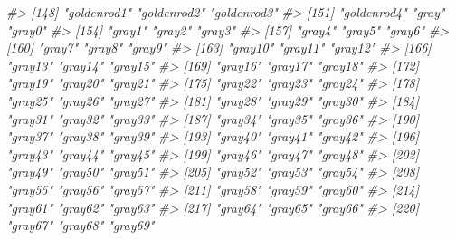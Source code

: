 \documentclass[
]{book}
\newenvironment{Shaded}{\begin{snugshade}}{\end{snugshade}}
\newcommand{\CommentTok}[1]{\textcolor[rgb]{0.56,0.35,0.01}{\textit{#1}}}
\begin{document}
\begin{Shaded}
\begin{Highlighting}[]
\CommentTok{\#\textgreater{} [148] "goldenrod1"           "goldenrod2"           "goldenrod3"          }
\CommentTok{\#\textgreater{} [151] "goldenrod4"           "gray"                 "gray0"               }
\CommentTok{\#\textgreater{} [154] "gray1"                "gray2"                "gray3"               }
\CommentTok{\#\textgreater{} [157] "gray4"                "gray5"                "gray6"               }
\CommentTok{\#\textgreater{} [160] "gray7"                "gray8"                "gray9"               }
\CommentTok{\#\textgreater{} [163] "gray10"               "gray11"               "gray12"              }
\CommentTok{\#\textgreater{} [166] "gray13"               "gray14"               "gray15"              }
\CommentTok{\#\textgreater{} [169] "gray16"               "gray17"               "gray18"              }
\CommentTok{\#\textgreater{} [172] "gray19"               "gray20"               "gray21"              }
\CommentTok{\#\textgreater{} [175] "gray22"               "gray23"               "gray24"              }
\CommentTok{\#\textgreater{} [178] "gray25"               "gray26"               "gray27"              }
\CommentTok{\#\textgreater{} [181] "gray28"               "gray29"               "gray30"              }
\CommentTok{\#\textgreater{} [184] "gray31"               "gray32"               "gray33"              }
\CommentTok{\#\textgreater{} [187] "gray34"               "gray35"               "gray36"              }
\CommentTok{\#\textgreater{} [190] "gray37"               "gray38"               "gray39"              }
\CommentTok{\#\textgreater{} [193] "gray40"               "gray41"               "gray42"              }
\CommentTok{\#\textgreater{} [196] "gray43"               "gray44"               "gray45"              }
\CommentTok{\#\textgreater{} [199] "gray46"               "gray47"               "gray48"              }
\CommentTok{\#\textgreater{} [202] "gray49"               "gray50"               "gray51"              }
\CommentTok{\#\textgreater{} [205] "gray52"               "gray53"               "gray54"              }
\CommentTok{\#\textgreater{} [208] "gray55"               "gray56"               "gray57"              }
\CommentTok{\#\textgreater{} [211] "gray58"               "gray59"               "gray60"              }
\CommentTok{\#\textgreater{} [214] "gray61"               "gray62"               "gray63"              }
\CommentTok{\#\textgreater{} [217] "gray64"               "gray65"               "gray66"              }
\CommentTok{\#\textgreater{} [220] "gray67"               "gray68"               "gray69"              }

\end{Highlighting}
\end{Shaded}
\end{document}
